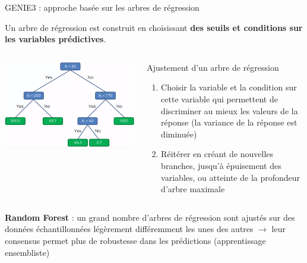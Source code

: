\begin{frame}{GENIE3 : approche basée sur les arbres de régression}


\small Un arbre de régression est construit en choisissant \textbf{des seuils et conditions sur les variables prédictives}.

\begin{columns}
\begin{column}{.45\textwidth}
\includegraphics[scale = 0.2]{Figures/Regression/regressionTree.png}
\end{column}
\begin{column}{.45\textwidth}
\small Ajustement d'un arbre de régression
\begin{enumerate}\scriptsize
    \item Choisir la variable et la condition sur cette variable qui permettent de discriminer au mieux les valeurs de la réponse (la variance de la réponse est diminuée)
    \item Réitérer en créant de nouvelles branches, jusqu'à épuisement des variables, ou atteinte de la profondeur d'arbre maximale
\end{enumerate}
\end{column}
\end{columns}
\vspace{0.5cm}

\scriptsize \textbf{Random Forest} : un grand nombre d'arbres de régression sont ajustés sur des données échantillonnées légèrement différemment les unes des autres $\rightarrow$ leur consensus permet plus de robustesse dans les prédictions (apprentissage ensembliste)

\end{frame}



